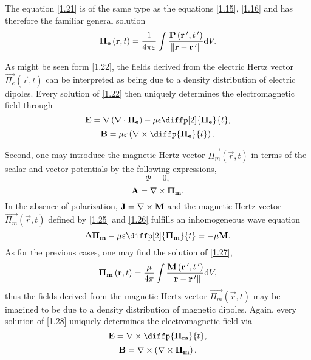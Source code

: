 The equation \ref{1.21} is of the same type as the equations \ref{1.15}, \ref{1.16} and has therefore the familiar general solution 
\begin{equation}
\label{1.22}
\mathbf{\Pi_e}\left(\mathbf{r}, t \right) = \frac{1}{4 \pi \varepsilon} \int \frac{\mathbf{P}\left(\mathbf{r^{\: \prime}}, t^{\: \prime} \right)}{\lVert\mathbf{r} - \mathbf{r^{\: \prime}}\rVert} \mathrm{d} V.
\end{equation}

As might be seen form \ref{1.22}, the fields derived from the electric Hertz vector $ {\vec{\Pi_e}}\left(\vec{r}, t \right) $ can be interpreted as being due to a density distribution of electric dipoles. Every solution of \ref{1.22} then uniquely determines the electromagnetic field through
\begin{equation}
\label{1.23}
\vec{E} = \grad{\left(\div{\vec{\Pi_e}}\right)} - \mu \epsilon \diffp[2]{\vec{\Pi_e}}{t},
\end{equation}
\begin{equation}
\label{1.24}
\vec{B} = \mu \varepsilon \left(\rot{\diffp{\vec{\Pi_e}}{t}}\right).
\end{equation}

Second, one may introduce the magnetic Hertz vector $ {\vec{\Pi_m}}\left(\vec{r}, t \right) $ in terms of the scalar and vector potentials by the following expressions,
\begin{equation}
\label{1.25}
\Phi = 0,
\end{equation}
\begin{equation}
\label{1.26}
\mathbf{A} = \nabla \times \mathbf{\Pi_m}.
\end{equation}
In the absence of polarization, $ \mathbf{J} = \nabla \times \mathbf{M} $ and the magnetic Hertz vector $ {\vec{\Pi_m}}\left(\vec{r}, t \right) $ defined by \ref{1.25} and \ref{1.26} fulfills an inhomogeneous wave equation
\begin{equation}
\label{1.27}
\laplace{\vec{\Pi_m}} - \mu \varepsilon \diffp[2]{\vec{\Pi_m}}{t} = -\mu \vec{M}.
\end{equation}
As for the previous cases, one may find the solution of \ref{1.27},
\begin{equation}
\label{1.28}
\mathbf{\Pi_m}\left(\mathbf{r}, t \right) = \frac{\mu}{4 \pi} \int \frac{\mathbf{M}\left(\mathbf{r^{\: \prime}}, t^{\: \prime} \right)}{\lVert\mathbf{r} - \mathbf{r^{\: \prime}}\rVert} \mathrm{d} V,
\end{equation}
thus the fields derived from the magnetic Hertz vector $ {\vec{\Pi_m}}\left(\vec{r}, t \right) $ may be imagined to be due to a density distribution of magnetic dipoles. Again, every solution of \ref{1.28} uniquely determines the electromagnetic field via
\begin{equation}
\label{1.29}
\vec{E} = \rot{\diffp{\vec{\Pi_m}}{t}},
\end{equation}
\begin{equation}
\label{1.30}
\mathbf{B} = \nabla \times \left(\nabla \times \mathbf{\Pi_m}\right).
\end{equation}

